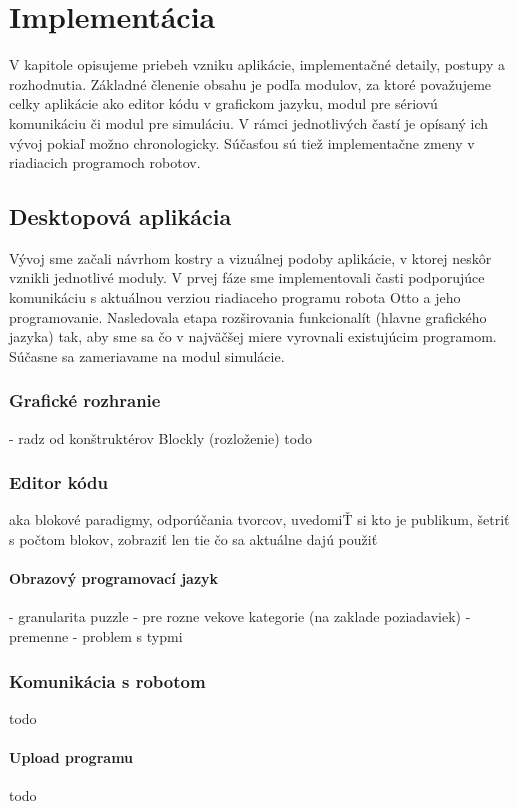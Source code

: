 \chapter{Implementácia}
\label{kap:implementacia}

V kapitole opisujeme priebeh vzniku aplikácie, implementačné detaily, postupy a rozhodnutia. Základné členenie obsahu je podľa modulov, za ktoré považujeme celky aplikácie ako editor kódu v grafickom jazyku, modul pre sériovú komunikáciu či modul pre simuláciu. V rámci jednotlivých častí je opísaný ich vývoj pokiaľ možno chronologicky. Súčasťou sú tiež implementačne zmeny v riadiacich programoch robotov.

\section{Desktopová aplikácia}
Vývoj sme začali návrhom kostry a vizuálnej podoby aplikácie, v ktorej neskôr vznikli jednotlivé moduly. V prvej fáze sme implementovali časti podporujúce komunikáciu s aktuálnou verziou riadiaceho programu robota Otto a jeho programovanie. Nasledovala etapa rozširovania funkcionalít (hlavne grafického jazyka) tak, aby sme sa čo v najväčšej miere vyrovnali existujúcim programom. Súčasne sa zameriavame na modul simulácie.

\subsection{Grafické rozhranie}
- radz od konštruktérov Blockly (rozloženie)
todo

\subsection{Editor kódu}
aka blokové paradigmy, odporúčania tvorcov, uvedomiŤ si kto je publikum, šetriť s počtom blokov, zobraziť len tie čo sa aktuálne dajú použiť

\subsubsection{Obrazový programovací jazyk}
- granularita puzzle
- pre rozne vekove kategorie (na zaklade poziadaviek)
- premenne - problem s typmi

\subsection{Komunikácia s robotom}
todo

\subsubsection{Upload programu}
todo

